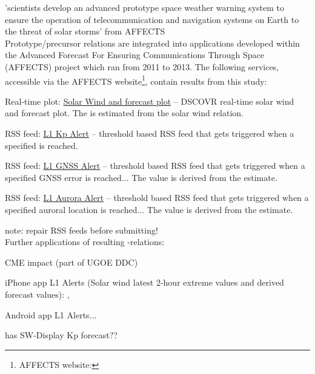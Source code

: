 'scientists develop an advanced prototype space weather warning system to ensure the operation of telecommunication and navigation systems on Earth to the threat of solar storms' from AFFECTS\\

Prototype/precursor relations are integrated into applications developed within the Advanced Forecast For Ensuring Communications Through Space (\mbox{AFFECTS}) project which ran from 2011 to 2013. The following services, accessible via the \mbox{AFFECTS} website\footnote{AFFECTS website: }, contain results from this \Kp{} study:
\begin{itemize*}
	\item Real-time plot: \href{http://www.affects-fp7.eu/rssfeeds/ace_ap_forecast_plot/ace_realtime_ap_CH_GFT_plot.png}{Solar Wind and \Kp{} forecast plot} -- DSCOVR real-time solar wind and \Kp{} forecast plot. The \Kp{} is estimated from the solar wind relation.
	\item RSS feed: \href{http://www.affects-fp7.eu/rssfeeds/rssfeed_kp/rssfeed_kp.xml}{L1 Kp Alert} -- threshold based RSS feed that gets triggered when a specified \Kp{} is reached.
	\item RSS feed: \href{http://www.affects-fp7.eu/rssfeeds/rssfeed_gnss/rssfeed_gnss.xml}{L1 GNSS Alert} -- threshold based RSS feed that gets triggered when a specified GNSS error is reached... The value is derived from the \Kp{} estimate.
	\item RSS feed: \href{http://www.affects-fp7.eu/rssfeeds/rssfeed_aurora/rssfeed_aurora.xml}{L1 Aurora Alert} -- threshold based RSS feed that gets triggered when a specified auroral location is reached... The value is derived from the \Kp{} estimate.
\end{itemize*}

note: repair RSS feeds before submitting!\\

\noindent Further applications of resulting \Kp{}-relations:
\begin{itemize*}
	\item CME \Kp{} impact (part of UGOE DDC)
	\item iPhone app L1 Alerts (Solar wind latest 2-hour extreme values and derived forecast values): , 
	\item Android app L1 Alerts... 
	\item has SW-Display Kp forecast??
\end{itemize*}

